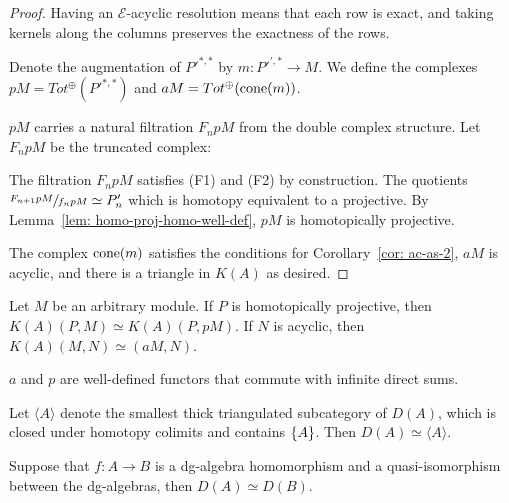 \documentclass[../thesis.tex]{subfiles}
\begin{document}
\begin{proof}
                Having an $\mathcal{E}$-acyclic resolution means that each row is exact, and taking kernels along the columns preserves the exactness of the rows.
                
                Denote the augmentation of $P'^{*,*}$ by $m : P'^{',*} \rightarrow M$. We define the complexes $pM = Tot^\oplus(P'^{*,*})$ and $aM = Tot^\oplus(\tt{cone}(m))$.
                
                $pM$ carries a natural filtration $F_npM$ from the double complex structure. Let $F_npM$ be the truncated complex:
                \begin{center}
                \end{center}
                
                The filtration $F_npM$ satisfies (F1) and (F2) by construction. The quotients $\sfrac{F_{n+1}pM}{f_npM} \simeq P'_n$ which is homotopy equivalent to a projective. By Lemma~\ref{lem: homo-proj-homo-well-def}, $pM$ is homotopically projective.
                
                The complex $\tt{cone}(m)$ satisfies the conditions for Corollary~\ref{cor: ac-as-2}, $aM$ is acyclic, and there is a triangle in $K(A)$ as desired.
            \end{proof}

            \begin{corollary}
                Let $M$ be an arbitrary module. If $P$ is homotopically projective, then $K(A)(P,M) \simeq K(A)(P, pM)$. If $N$ is acyclic, then $K(A)(M, N) \simeq (aM, N)$.

                $a$ and $p$ are well-defined functors that commute with infinite direct sums. 
            \end{corollary}

            \begin{corollary}\label{cor: small-n-thick}
                Let $\langle A \rangle$ denote the smallest thick triangulated subcategory of $D(A)$, which is closed under homotopy colimits and contains $\startset{A}$. Then $D(A) \simeq \langle A \rangle$.
            \end{corollary}

            \begin{corollary}\label{cor: ring-qiso-is-eq}
                Suppose that $f: A \rightarrow B$ is a dg-algebra homomorphism and a quasi-isomorphism between the dg-algebras, then $D(A) \simeq D(B)$.
            \end{corollary}
\end{document}
